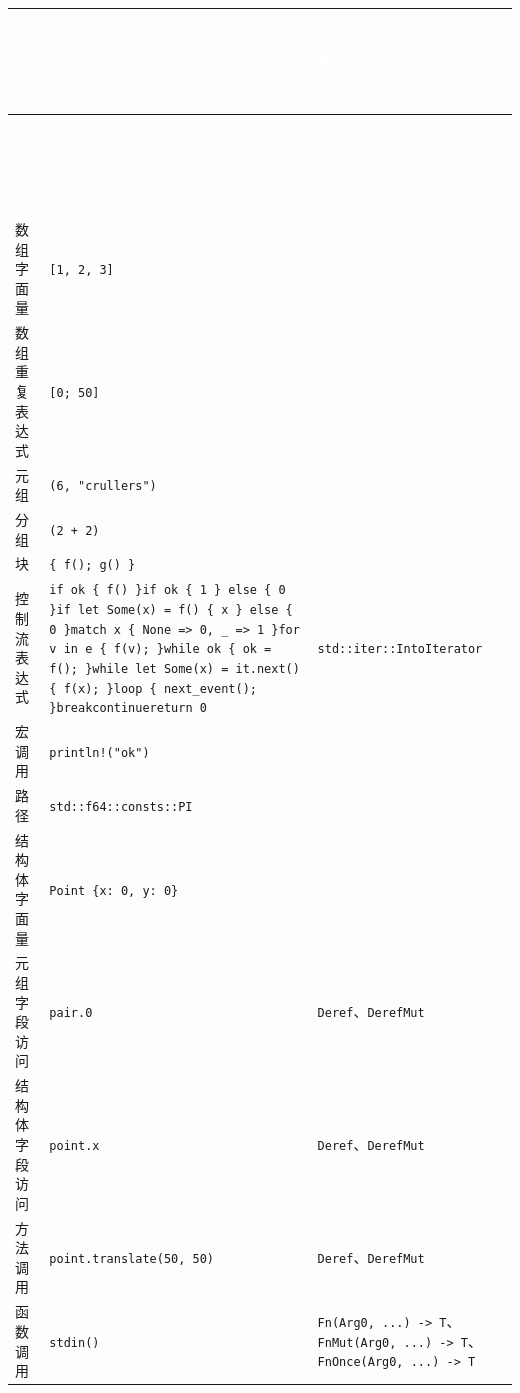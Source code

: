 \myTableBegin
\begin{xltabular}{\textwidth}{@{}>{\hsize\raggedright\arraybackslash}X>{\hsize\raggedright\arraybackslash}X>{\hsize\raggedright\arraybackslash}X@{}}
\textcolor{white}{表达式类型} & \textcolor{white}{示例} & \textcolor{white}{相关特型} \\
\endfirsthead
{}\textcolor{white}{表达式类型} & \textcolor{white}{示例} & \textcolor{white}{相关特型} \\
\endhead
数组字面量 & \texttt{[1, 2, 3]} &  \\
数组重复表达式 & \texttt{[0; 50]} &  \\
元组 & \texttt{(6, "crullers")} &  \\
分组 & \texttt{(2 + 2)} &  \\
块 & \texttt{\{ f(); g() \}} &  \\
控制流表达式 & \texttt{if ok \{ f() \}}\newline{}\texttt{if ok \{ 1 \} else \{ 0 \}}\newline{}\texttt{if let Some(x) = f() \{ x \} else \{ 0 \}}\newline{}\texttt{match x \{ None => 0, \_ => 1 \}}\newline{}\texttt{for v in e \{ f(v); \}}\newline{}\texttt{while ok \{ ok = f(); \}}\newline{}\texttt{while let Some(x) = it.next() \{ f(x); \}}\newline{}\texttt{loop \{ next\_event(); \}}\newline{}\texttt{break}\newline{}\texttt{continue}\newline{}\texttt{return 0} & \texttt{std::iter::IntoIterator} \\
宏调用 & \texttt{println!("ok")} &  \\
路径 & \texttt{std::f64::consts::PI} &  \\
结构体字面量 & \texttt{Point \{x: 0, y: 0\}} &  \\
元组字段访问 & \texttt{pair.0} & \texttt{Deref}、\texttt{DerefMut} \\
结构体字段访问 & \texttt{point.x} & \texttt{Deref}、\texttt{DerefMut} \\
方法调用 & \texttt{point.translate(50, 50)} & \texttt{Deref}、\texttt{DerefMut} \\
函数调用 & \texttt{stdin()} & \texttt{Fn(Arg0, ...) -> T}、\texttt{FnMut(Arg0, ...) -> T}、\texttt{FnOnce(Arg0, ...) -> T} \\

\end{xltabular}
